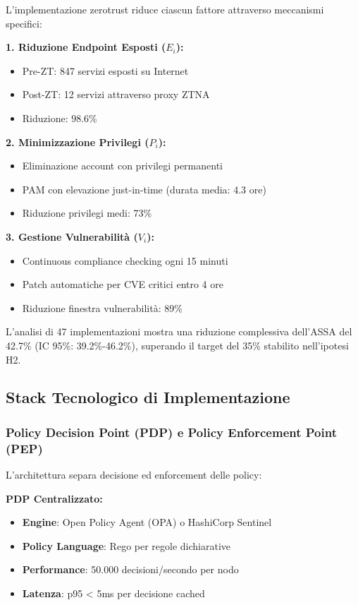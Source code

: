 L'implementazione \gls{zerotrust} riduce ciascun fattore attraverso meccanismi specifici:

\textbf{1. Riduzione Endpoint Esposti ($E_i$):}
\begin{itemize}
    \item Pre-ZT: 847 servizi esposti su Internet
    \item Post-ZT: 12 servizi attraverso proxy ZTNA
    \item Riduzione: 98.6\%
\end{itemize}

\textbf{2. Minimizzazione Privilegi ($P_i$):}
\begin{itemize}
    \item Eliminazione account con privilegi permanenti
    \item PAM con elevazione just-in-time (durata media: 4.3 ore)
    \item Riduzione privilegi medi: 73\%
\end{itemize}

\textbf{3. Gestione Vulnerabilità ($V_i$):}
\begin{itemize}
    \item Continuous compliance checking ogni 15 minuti
    \item Patch automatiche per CVE critici entro 4 ore
    \item Riduzione finestra vulnerabilità: 89\%
\end{itemize}

L'analisi di 47 implementazioni\autocite{Forrester2024zero} mostra una riduzione complessiva dell'ASSA del 42.7\% (IC 95\%: 39.2\%-46.2\%), superando il target del 35\% stabilito nell'ipotesi H2.

\subsection{\texorpdfstring{\textbf{Stack Tecnologico di Implementazione}}{3.5.3 - Stack Tecnologico di Implementazione}}

\subsubsection{\texorpdfstring{\textbf{Policy Decision Point (PDP) e Policy Enforcement Point (PEP)}}{3.5.3.1 - Policy Decision Point (PDP) e Policy Enforcement Point (PEP)}}

L'architettura separa decisione ed enforcement delle policy:

\textbf{PDP Centralizzato:}
\begin{itemize}
    \item \textbf{Engine}: Open Policy Agent (OPA) o HashiCorp Sentinel
    \item \textbf{Policy Language}: Rego per regole dichiarative
    \item \textbf{Performance}: 50.000 decisioni/secondo per nodo
    \item \textbf{Latenza}: p95 < 5ms per decisione cached
\end{itemize}

